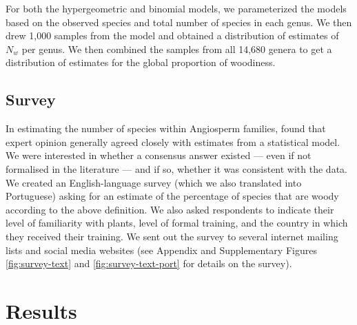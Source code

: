 \documentclass[a4paper,12pt]{article}
\begin{document}
For both the hypergeometric and binomial models, we parameterized the
models based on the observed species and total number of species in
each genus.  We then drew 1,000 samples from the model and obtained a
distribution of estimates of $N_w$ per genus. We then combined the
samples from all 14,680 genera to get a distribution of estimates for
the global proportion of woodiness.

\subsection{Survey}

%
In estimating the number of species within Angiosperm families,
\citet{joppa2010} found that expert opinion generally agreed closely
with estimates from a statistical model.  We were interested in
whether a consensus answer existed --- even if not formalised in the
literature --- and if so, whether it was consistent with the data.
% 
We created an English-language survey (which we also translated into
Portuguese) asking for an estimate of the percentage of species that
are woody according to the above definition.  We also asked
respondents to indicate their level of familiarity with plants, level
of formal training, and the country in which they received their
training. We sent out the survey to several internet mailing lists and
social media websites (see Appendix and Supplementary Figures
\ref{fig:survey-text} and  \ref{fig:survey-text-port} for details on the
survey).

\section{Results}
\end{document}
